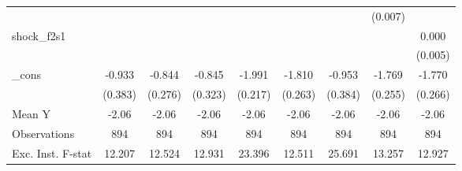 {\begin{tabular}{l*{8}{c}}
            &                     &                     &                     &                     &                     &                     &     (0.007)         &                     \\
\addlinespace
shock\_f2s1  &                     &                     &                     &                     &                     &                     &                     &       0.000         \\
            &                     &                     &                     &                     &                     &                     &                     &     (0.005)         \\
\addlinespace
\_cons      &      -0.933\sym{**} &      -0.844\sym{***}&      -0.845\sym{**} &      -1.991\sym{***}&      -1.810\sym{***}&      -0.953\sym{**} &      -1.769\sym{***}&      -1.770\sym{***}\\
            &     (0.383)         &     (0.276)         &     (0.323)         &     (0.217)         &     (0.263)         &     (0.384)         &     (0.255)         &     (0.266)         \\
\midrule
Mean Y      &       -2.06         &       -2.06         &       -2.06         &       -2.06         &       -2.06         &       -2.06         &       -2.06         &       -2.06         \\
Observations&         894         &         894         &         894         &         894         &         894         &         894         &         894         &         894         \\
Exc. Inst. F-stat&      12.207         &      12.524         &      12.931         &      23.396         &      12.511         &      25.691         &      13.257         &      12.927         \\
\bottomrule
\end{tabular}
}

